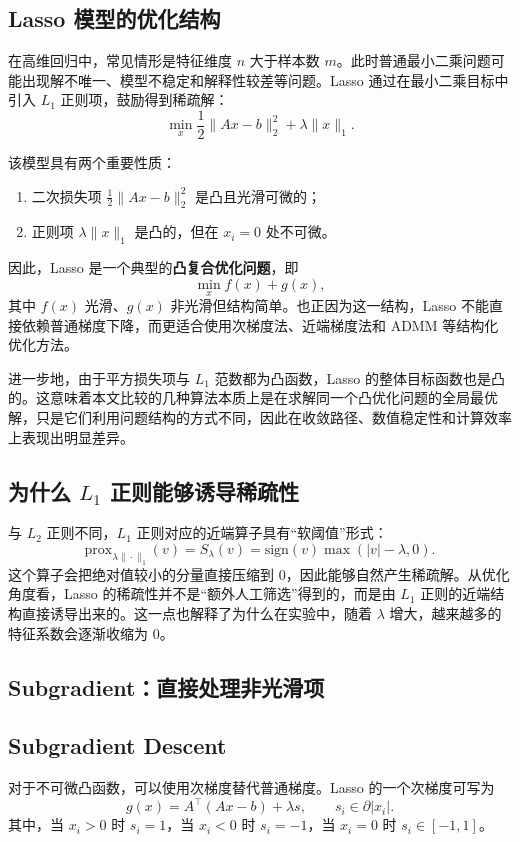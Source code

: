 \documentclass[12pt,a4paper]{ctexart}
\begin{document}
\subsection{Lasso 模型的优化结构}
在高维回归中，常见情形是特征维度 $n$ 大于样本数 $m$。此时普通最小二乘问题可能出现解不唯一、模型不稳定和解释性较差等问题。Lasso 通过在最小二乘目标中引入 $L_1$ 正则项，鼓励得到稀疏解：
\[
\min_x \frac{1}{2}\|Ax-b\|_2^2 + \lambda \|x\|_1.
\]

该模型具有两个重要性质：
\begin{enumerate}[label=\arabic*.]
    \item 二次损失项 $\frac{1}{2}\|Ax-b\|_2^2$ 是凸且光滑可微的；
    \item 正则项 $\lambda \|x\|_1$ 是凸的，但在 $x_i=0$ 处不可微。
\end{enumerate}

因此，Lasso 是一个典型的\textbf{凸复合优化问题}，即
\[
\min_x f(x) + g(x),
\]
其中 $f(x)$ 光滑、$g(x)$ 非光滑但结构简单。也正因为这一结构，Lasso 不能直接依赖普通梯度下降，而更适合使用次梯度法、近端梯度法和 ADMM 等结构化优化方法。

进一步地，由于平方损失项与 $L_1$ 范数都为凸函数，Lasso 的整体目标函数也是凸的。这意味着本文比较的几种算法本质上是在求解同一个凸优化问题的全局最优解，只是它们利用问题结构的方式不同，因此在收敛路径、数值稳定性和计算效率上表现出明显差异。

\subsection{为什么 $L_1$ 正则能够诱导稀疏性}
与 $L_2$ 正则不同，$L_1$ 正则对应的近端算子具有“软阈值”形式：
\[
\mathrm{prox}_{\lambda \|\cdot\|_1}(v)
=
S_\lambda(v)
=
\mathrm{sign}(v)\max(|v|-\lambda,0).
\]
这个算子会把绝对值较小的分量直接压缩到 0，因此能够自然产生稀疏解。从优化角度看，Lasso 的稀疏性并不是“额外人工筛选”得到的，而是由 $L_1$ 正则的近端结构直接诱导出来的。这一点也解释了为什么在实验中，随着 $\lambda$ 增大，越来越多的特征系数会逐渐收缩为 0。

\subsection{Subgradient：直接处理非光滑项}
\subsection{Subgradient Descent}
对于不可微凸函数，可以使用次梯度替代普通梯度。Lasso 的一个次梯度可写为
\[
g(x)=A^\top(Ax-b)+\lambda s,\qquad s_i\in \partial |x_i|.
\]
其中，当 $x_i>0$ 时 $s_i=1$，当 $x_i<0$ 时 $s_i=-1$，当 $x_i=0$ 时 $s_i\in[-1,1]$。
\end{document}

